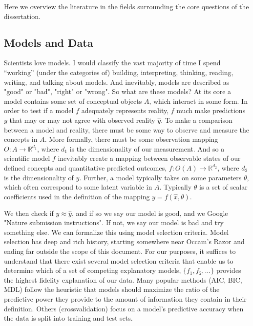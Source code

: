\documentclass[]{article}
\begin{document}
Here we overview the literature in the fields surrounding the core questions of the dissertation.

\hypertarget{models-and-data}{%
\subsection{Models and Data}\label{models-and-data}}

Scientists love models. I would classify the vast majority of time I
spend ``working'' (under the categories of) building, interpreting,
thinking, reading, writing, and talking about models. And inevitably,
models are described as "good" or "bad", "right" or "wrong". So
what are these models? At its core a model contains some set of
conceptual objects \(A\), which interact in some form. In order to test
if a model \(f\) adequately represents reality, \(f\) much make
predictions \(y\) that may or may not agree with observed reality
\(\hat{y}\). To make a comparison between a model and reality, there
must be some way to observe and measure the concepts in \(A\). More
formally, there must be some observation mapping
\(O: A \to \mathbb{R}^{d_1}\), where \(d_1\) is the dimensionality of
our measurement. And so a scientific model \(f\) inevitably create a
mapping between observable states of our defined concepts and
quantitative predicted outcomes, \(f : O(A) \to \mathbb{R}^{d_2}\),
where \(d_2\) is the dimensionality of \(y\). Further, a model typically
takes on some parameters \(\theta\), which often correspond to some
latent variable in \(A\). Typically \(\theta\) is a set of scalar
coefficients used in the definition of the mapping
\(y = f(\hat{x}, \theta)\).

We then check if \(y \approx \hat{y}\), and if so we say our model is
good, and we Google "Nature submission instructions". If not, we say
our model is bad and try something else. We can formalize this using
model selection criteria. Model selection has deep and rich history,
starting somewhere near Occam's Razor and ending far outside the
scope of this document. For our purposes, it suffices to understand that
there exist several model selection criteria that enable us to determine
which of a set of competing explanatory models, \(\{f_1, f_2, \dots\}\)
provides the highest fidelity explanation of our data. Many popular
methods (AIC, BIC, MDL) follow the heuristic that models should maximize
the ratio of the predictive power they provide to the amount of
information they contain in their definition. Others (crossvalidation)
focus on a model's predictive accuracy when the data is split into
training and test sets.
\end{document}

